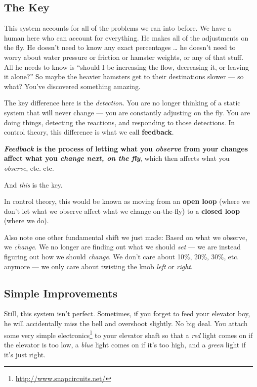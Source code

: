 \documentclass[]{article}
\renewcommand{\href}[2]{#2\footnote{\url{#1}}}
\begin{document}
\subsection{The Key}\label{the-key}

This system accounts for all of the problems we ran into before. We have a human
here who can account for everything. He makes all of the adjustments on the fly.
He doesn't need to know any exact percentages \ldots{} he doesn't need to worry
about water pressure or friction or hamster weights, or any of that stuff. All
he needs to know is ``should I be increasing the flow, decreasing it, or leaving
it alone?'' So maybe the heavier hamsters get to their destinations slower ---
so what? You've discovered something amazing.

The key difference here is the \emph{detection}. You are no longer thinking of a
static system that will never change --- you are constantly adjusting on the
fly. You are doing things, detecting the reactions, and responding to those
detections. In control theory, this difference is what we call
\textbf{feedback}.

\textbf{\emph{Feedback} is the process of letting what you \emph{observe} from
your changes affect what you \emph{change next, on the fly}}, which then affects
what you \emph{observe}, etc. etc.

And \emph{this} is the key.

In control theory, this would be known as moving from an \textbf{open loop}
(where we don't let what we observe affect what we change on-the-fly) to a
\textbf{closed loop} (where we do).

Also note one other fundamental shift we just made: Based on what we observe, we
\emph{change}. We no longer are finding out what we should \emph{set} --- we are
instead figuring out how we should \emph{change}. We don't care about 10\%,
20\%, 30\%, etc. anymore --- we only care about twisting the knob \emph{left} or
\emph{right}.

\subsection{Simple Improvements}\label{simple-improvements}

Still, this system isn't perfect. Sometimes, if you forget to feed your elevator
boy, he will accidentally miss the bell and overshoot slightly. No big deal. You
attach some \href{http://www.snapcircuits.net/}{very simple electronics} to your
elevator shaft so that a \emph{red} light comes on if the elevator is too low, a
\emph{blue} light comes on if it's too high, and a \emph{green} light if it's
just right.
\end{document}
